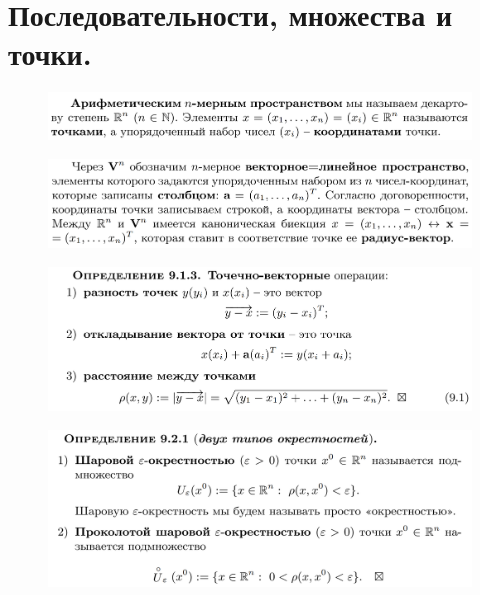 \documentclass{article}
\date{}
\begin{document}
\noindent

\tableofcontents

\newpage
\section{Последовательности, множества и точки.}
\vspace{-0.5cm}
\begin{figure}[h!]
    \centering
    \includegraphics[width=\textwidth]{1.png}
    \vspace{-1cm}
\end{figure}
\begin{figure}[h!]
    \centering
    \includegraphics[width=\textwidth]{12.png}
    \vspace{-1cm}
\end{figure}
\begin{figure}[h!]
    \centering
    \includegraphics[width=\textwidth]{11.png}
    \vspace{-1cm}
\end{figure}
\begin{figure}[h!]
    \centering
    \includegraphics[width=\textwidth]{7.png}
    \vspace{-1cm}
\end{figure}
\newpage
\end{document}
